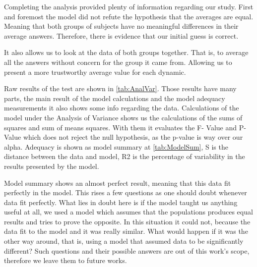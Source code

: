 Completing the analysis provided plenty of information regarding our study. First and foremost the model did not refute the hypothesis that the averages are equal. Meaning that both groups of subjects have no meaningful differences in their average answers. Therefore, there is evidence that our initial guess is correct. 

It also allows us to look at the data of both groups together. That is, to average all the answers without concern for the group it came from. Allowing us to present a more trustworthy average value for each dynamic. 



Raw results of the test are shown in \ref{tab:AnalVar}. Those results have many parts, the main result of the model calculations and the model adequacy measurements it also shows some info regarding the data. Calculations of the model under the Analysis of Variance shows us the calculations of the sums of squares and sum of means squares. With them it evaluates the F- Value and P-Value which does not reject the null hypothesis, as the p-value is way over our alpha. Adequacy is shown as model summary at \ref{tab:ModelSum}, S is the distance between the data and model, R2 is the percentage of variability in the results presented by the model.

Model summary shows an almost perfect result, meaning that this data fit perfectly in the model. This rises a few questions as one should doubt whenever data fit perfectly. What lies in doubt here is if the model taught us anything useful at all, we used a model which assumes that the populations produces equal results and tries to prove the opposite. In this situation it could not, because the data fit to the model and it was really similar. What would happen if it was the other way around, that is, using a model that assumed data to be significantly different? Such questions and their possible answers are out of this work's scope, therefore we leave them to future works.